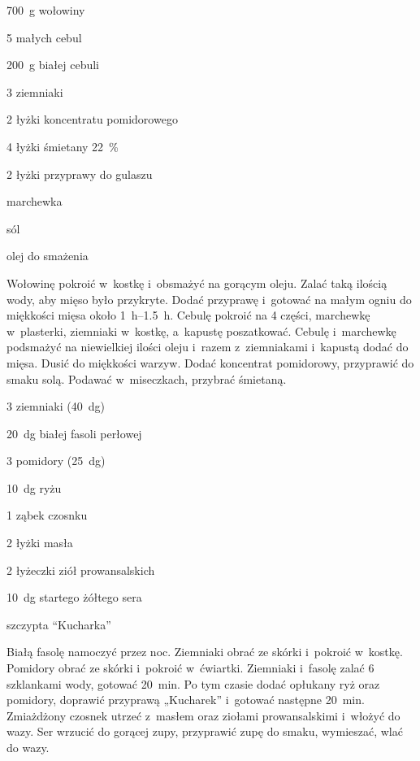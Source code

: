 \documentclass[../kucharek.tex]{subfiles}
\begin{document}

\begin{Ingred}
    \item \qty{700}{\gram} wołowiny
    \item \num{5} małych cebul
    \item \qty{200}{\gram} białej cebuli
    \item \num{3} ziemniaki
    \item \num{2} łyżki koncentratu pomidorowego
    \item \num{4} łyżki śmietany \qty{22}{\percent}
    \item \num{2} łyżki przyprawy do gulaszu
    \item marchewka
    \item sól
    \item olej do smażenia
\end{Ingred}

Wołowinę pokroić w~kostkę i~obsmażyć na gorącym oleju. Zalać taką ilością wody,
aby mięso było przykryte. Dodać przyprawę i~gotować na małym ogniu do miękkości
mięsa około \qtyrange{1}{1.5}{\hour}. Cebulę pokroić na \num{4} części,
marchewkę w~plasterki, ziemniaki w~kostkę, a~kapustę poszatkować. Cebulę
i~marchewkę podsmażyć na niewielkiej ilości oleju i~razem z~ziemniakami
i~kapustą dodać do mięsa. Dusić do miękkości warzyw. Dodać koncentrat
pomidorowy, przyprawić do smaku solą. Podawać w~miseczkach, przybrać śmietaną.


\begin{Ingred}
    \item \num{3} ziemniaki (\qty{40}{\deca\gram})
    \item \qty{20}{\deca\gram} białej fasoli perłowej
    \item \num{3} pomidory (\qty{25}{\deca\gram})
    \item \qty{10}{\deca\gram} ryżu
    \item \num{1} ząbek czosnku
    \item \num{2} łyżki masła
    \item \num{2} łyżeczki ziół prowansalskich
    \item \qty{10}{\deca\gram} startego żółtego sera
    \item szczypta \enquote{Kucharka}
\end{Ingred}

Białą fasolę namoczyć przez noc. Ziemniaki obrać ze skórki i~pokroić w~kostkę.
Pomidory obrać ze skórki i~pokroić w~ćwiartki. Ziemniaki i~fasolę zalać \num{6}
szklankami wody, gotować \qty{20}{\minute}. Po tym czasie dodać opłukany ryż
oraz pomidory, doprawić przyprawą „Kucharek” i~gotować następne
\qty{20}{\minute}. Zmiażdżony czosnek utrzeć z~masłem oraz ziołami
prowansalskimi i~włożyć do wazy. Ser wrzucić do gorącej zupy, przyprawić zupę
do smaku, wymieszać, wlać do wazy.
\end{document}

